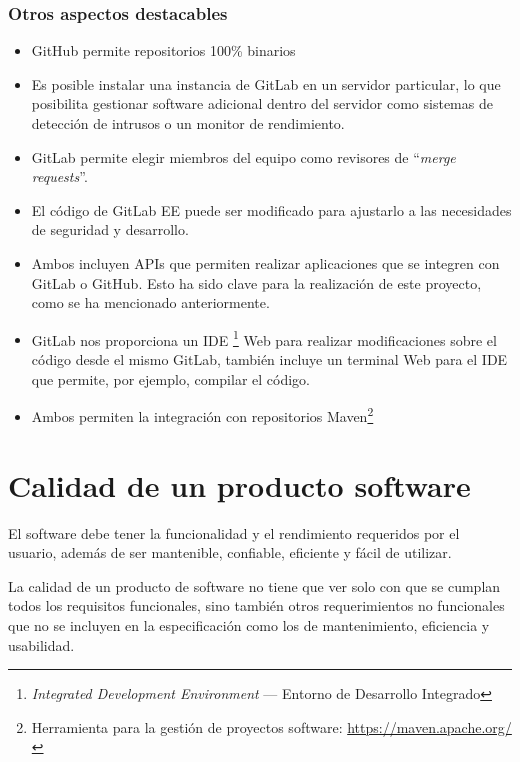 \subsubsection{Otros aspectos destacables}
\begin{itemize}
	\tightlist
	\item GitHub permite repositorios 100\% binarios
	\item Es posible instalar una instancia de GitLab en un servidor particular, lo que posibilita gestionar software adicional dentro del servidor como sistemas de detección de intrusos o un monitor de rendimiento.
	\item GitLab permite elegir miembros del equipo como revisores de ``\textit{merge requests}''.
	\item El código de GitLab EE puede ser modificado para ajustarlo a las necesidades de seguridad y desarrollo.
	\item Ambos incluyen APIs que permiten realizar aplicaciones que se integren con GitLab o GitHub. Esto ha sido clave para la realización de este proyecto, como se ha mencionado anteriormente.
	\item GitLab nos proporciona un  IDE \footnote{\textit{Integrated Development Environment} --- Entorno de Desarrollo Integrado } Web para realizar modificaciones sobre el código desde el mismo GitLab, también incluye un terminal Web para el IDE que permite, por ejemplo, compilar el código.
	\item Ambos permiten la integración con repositorios Maven\footnote{Herramienta para la gestión de proyectos software: \url{https://maven.apache.org/}}
\end{itemize}

\section{Calidad de un producto software}

El software debe tener la funcionalidad y el rendimiento requeridos por el usuario, además de ser mantenible, confiable, eficiente y fácil de utilizar.

La calidad de un producto de software no tiene que ver solo con que se cumplan todos los requisitos funcionales, sino también otros requerimientos no funcionales que no se incluyen en la especificación como los de mantenimiento, eficiencia y usabilidad.


